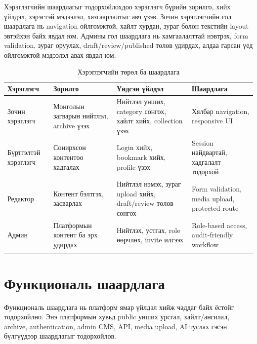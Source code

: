 Хэрэглэгчийн шаардлагыг тодорхойлохдоо хэрэглэгч бүрийн зорилго, хийх үйлдэл, хэрэгтэй мэдээлэл, хязгаарлалтыг авч үзэв. Зочин хэрэглэгчийн гол шаардлага нь navigation ойлгомжтой, хайлт хурдан, зураг болон текстийн layout эвтэйхэн байх явдал юм. Админы гол шаардлага нь хамгаалалттай нэвтрэх, form validation, зураг оруулах, draft/review/published төлөв удирдах, алдаа гарсан үед ойлгомжтой мэдээлэл авах явдал юм.

\begin{longtable}{|L{0.16\textwidth}|L{0.22\textwidth}|L{0.26\textwidth}|L{0.18\textwidth}|}
  \hline
  \textbf{Хэрэглэгч} & \textbf{Зорилго} & \textbf{Үндсэн үйлдэл} & \textbf{Шаардлага} \\ \hline
  Зочин хэрэглэгч & Монголын загварын нийтлэл, archive үзэх & Нийтлэл унших, category сонгох, хайлт хийх, collection үзэх & Хялбар navigation, responsive UI \\ \hline
  Бүртгэлтэй хэрэглэгч & Сонирхсон контентоо хадгалах & Login хийх, bookmark хийх, profile үзэх & Session найдвартай, хадгалалт тодорхой \\ \hline
  Редактор & Контент бэлтгэх, засварлах & Нийтлэл нэмэх, зураг upload хийх, draft/review төлөв сонгох & Form validation, media upload, protected route \\ \hline
  Админ & Платформын контент ба эрх удирдах & Нийтлэх, устгах, role өөрчлөх, invite илгээх & Role-based access, audit-friendly workflow \\ \hline
  \caption{Хэрэглэгчийн төрөл ба шаардлага}
  \label{tab:user-types-requirements}\\
\end{longtable}

\section{Функциональ шаардлага}
Функциональ шаардлага нь платформ ямар үйлдэл хийж чаддаг байх ёстойг тодорхойлно. Энэ платформын хувьд public унших урсгал, хайлт/ангилал, archive, authentication, admin CMS, API, media upload, AI туслах гэсэн бүлгүүдээр шаардлагыг тодорхойлов.

